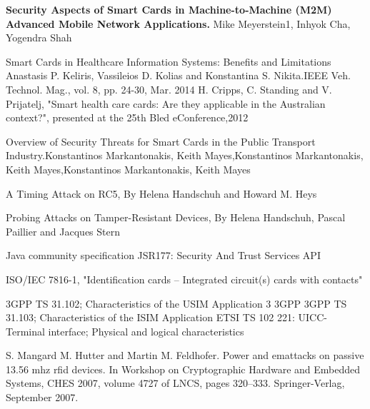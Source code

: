 \documentclass[12pt]{article}
\begin{document}
\newpage
\begin{thebibliography}{9}

\textbf{Security Aspects of Smart Cards in Machine-to-Machine (M2M) Advanced Mobile Network Applications.}
Mike Meyerstein1, Inhyok Cha, Yogendra Shah

Smart Cards in Healthcare Information Systems: Benefits and
Limitations
Anastasis P. Keliris, Vassileios D. Kolias and Konstantina S. Nikita.IEEE Veh. Technol. Mag., vol. 8, pp. 24-30, Mar. 2014
H. Cripps, C. Standing and V. Prijatelj, "Smart health care cards: Are
they applicable in the Australian context?", presented at the 25th Bled
eConference,2012

Overview of Security Threats for Smart Cards in the Public Transport
Industry.Konstantinos Markantonakis, Keith Mayes,Konstantinos Markantonakis, Keith Mayes,Konstantinos Markantonakis, Keith Mayes

A Timing Attack on RC5, By Helena Handschuh and Howard M. Heys

Probing Attacks on Tamper-Resistant Devices, By Helena Handschuh, Pascal
Paillier and Jacques Stern

Java community specification JSR177: Security And Trust Services API
 
ISO/IEC 7816-1, "Identification cards – Integrated circuit(s)
cards with contacts" 

3GPP TS 31.102; Characteristics of the USIM Application
3 3GPP
3GPP TS 31.103; Characteristics of the ISIM Application
ETSI TS 102 221: UICC-Terminal interface; Physical and logical characteristics

S. Mangard M. Hutter and Martin M. Feldhofer.
Power and emattacks on passive 13.56 mhz rfid devices. In
Workshop on Cryptographic Hardware and Embedded
Systems, CHES 2007, volume 4727 of LNCS, pages 320–333.
Springer-Verlag, September 2007.

\end{thebibliography}
\end{document}

